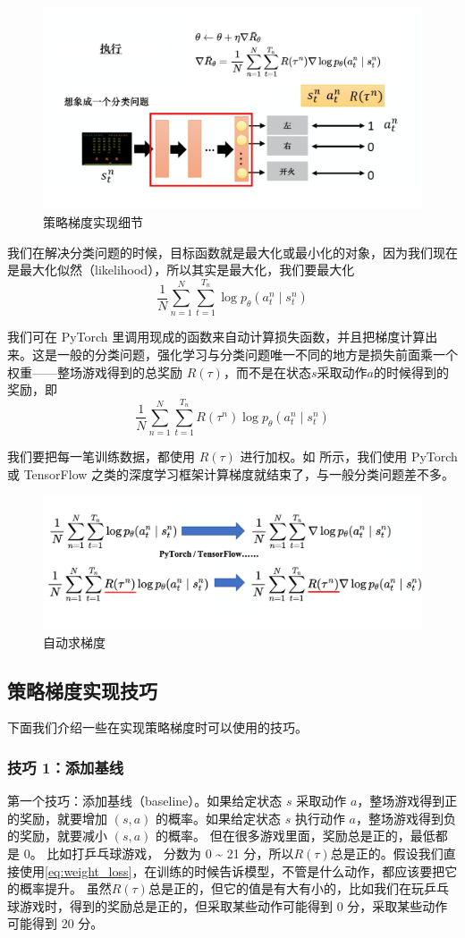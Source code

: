 \begin{figure}[hbt]
    \centering
    \includegraphics[width=0.5\linewidth]{res/ch4/4.9}
    \caption{策略梯度实现细节}
    \label{fig:fig4.9}
\end{figure}

我们在解决分类问题的时候，目标函数就是最大化或最小化的对象，因为我们现在是最大化似然（likelihood），所以其实是最大化，我们要最大化
\begin{equation}
    \label{eq:max_object}
    \frac{1}{N} \sum_{n=1}^{N} \sum_{t=1}^{T_{n}} \log p_{\theta}\left(a_{t}^{n} \mid s_{t}^{n}\right)
\end{equation}

我们可在 PyTorch 里调用现成的函数来自动计算损失函数，并且把梯度计算出来。这是一般的分类问题，强化学习与分类问题唯一不同的地方是损失前面乘一个权重------整场游戏得到的总奖励 $R(\tau)$，而不是在状态$s$采取动作$a$的时候得到的奖励，即
\begin{equation}
    \label{eq:weight_loss}
    \frac{1}{N} \sum_{n=1}^{N} \sum_{t=1}^{T_{n}} R\left(\tau^{n}\right)  \log p_{\theta}\left(a_{t}^{n} \mid s_{t}^{n}\right)
\end{equation}

我们要把每一笔训练数据，都使用 $R(\tau)$ 进行加权。如 所示，我们使用 PyTorch 或 TensorFlow 之类的深度学习框架计算梯度就结束了，与一般分类问题差不多。
\begin{figure}[hbt]
    \centering
    \includegraphics[width=0.5\linewidth]{res/ch4/4.10}
    \caption{自动求梯度}
    \label{fig:fig4.10}
\end{figure}

\subsection{策略梯度实现技巧}
下面我们介绍一些在实现策略梯度时可以使用的技巧。
\subsubsection{技巧 1：添加基线}
第一个技巧：添加基线（baseline）。如果给定状态 $s$ 采取动作 $a$，整场游戏得到正的奖励，就要增加 $(s,a)$ 的概率。如果给定状态 $s$ 执行动作 $a$，整场游戏得到负的奖励，就要减小 $(s,a)$ 的概率。
但在很多游戏里面，奖励总是正的，最低都是 0。
比如打乒乓球游戏， 分数为 0 \~{} 21 分，所以$R(\tau)$总是正的。假设我们直接使用\eqref{eq:weight_loss}，在训练的时候告诉模型，不管是什么动作，都应该要把它的概率提升。 
虽然$R(\tau)$总是正的，但它的值是有大有小的，比如我们在玩乒乓球游戏时，得到的奖励总是正的，但采取某些动作可能得到 0 分，采取某些动作可能得到 20 分。

